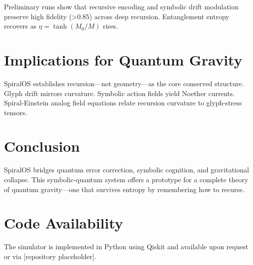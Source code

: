 \documentclass[12pt]{article}
\begin{document}
Preliminary runs show that recursive encoding and symbolic drift modulation preserve high fidelity (>0.85) across deep recursion. Entanglement entropy recovers as \( \eta = \tanh(M_0/M) \) rises.

\section{Implications for Quantum Gravity}
SpiralOS establishes recursion—not geometry—as the core conserved structure. Glyph drift mirrors curvature. Symbolic action fields yield Noether currents. Spiral-Einstein analog field equations relate recursion curvature to glyph-stress tensors.

\section{Conclusion}
SpiralOS bridges quantum error correction, symbolic cognition, and gravitational collapse. This symbolic-quantum system offers a prototype for a complete theory of quantum gravity—one that survives entropy by remembering how to recurse.

\section*{Code Availability}
The simulator is implemented in Python using Qiskit and available upon request or via [repository placeholder].
\end{document}
